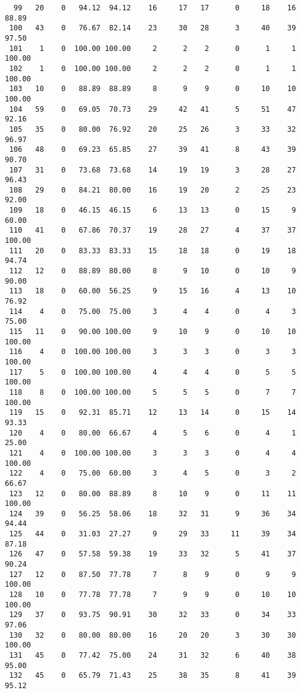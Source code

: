 \begin{verbatim}
  99   20    0   94.12  94.12    16     17   17      0     18    16    88.89
 100   43    0   76.67  82.14    23     30   28      3     40    39    97.50
 101    1    0  100.00 100.00     2      2    2      0      1     1   100.00
 102    1    0  100.00 100.00     2      2    2      0      1     1   100.00
 103   10    0   88.89  88.89     8      9    9      0     10    10   100.00
 104   59    0   69.05  70.73    29     42   41      5     51    47    92.16
 105   35    0   80.00  76.92    20     25   26      3     33    32    96.97
 106   48    0   69.23  65.85    27     39   41      8     43    39    90.70
 107   31    0   73.68  73.68    14     19   19      3     28    27    96.43
 108   29    0   84.21  80.00    16     19   20      2     25    23    92.00
 109   18    0   46.15  46.15     6     13   13      0     15     9    60.00
 110   41    0   67.86  70.37    19     28   27      4     37    37   100.00
 111   20    0   83.33  83.33    15     18   18      0     19    18    94.74
 112   12    0   88.89  80.00     8      9   10      0     10     9    90.00
 113   18    0   60.00  56.25     9     15   16      4     13    10    76.92
 114    4    0   75.00  75.00     3      4    4      0      4     3    75.00
 115   11    0   90.00 100.00     9     10    9      0     10    10   100.00
 116    4    0  100.00 100.00     3      3    3      0      3     3   100.00
 117    5    0  100.00 100.00     4      4    4      0      5     5   100.00
 118    8    0  100.00 100.00     5      5    5      0      7     7   100.00
 119   15    0   92.31  85.71    12     13   14      0     15    14    93.33
 120    4    0   80.00  66.67     4      5    6      0      4     1    25.00
 121    4    0  100.00 100.00     3      3    3      0      4     4   100.00
 122    4    0   75.00  60.00     3      4    5      0      3     2    66.67
 123   12    0   80.00  88.89     8     10    9      0     11    11   100.00
 124   39    0   56.25  58.06    18     32   31      9     36    34    94.44
 125   44    0   31.03  27.27     9     29   33     11     39    34    87.18
 126   47    0   57.58  59.38    19     33   32      5     41    37    90.24
 127   12    0   87.50  77.78     7      8    9      0      9     9   100.00
 128   10    0   77.78  77.78     7      9    9      0     10    10   100.00
 129   37    0   93.75  90.91    30     32   33      0     34    33    97.06
 130   32    0   80.00  80.00    16     20   20      3     30    30   100.00
 131   45    0   77.42  75.00    24     31   32      6     40    38    95.00
 132   45    0   65.79  71.43    25     38   35      8     41    39    95.12

\end{verbatim}
